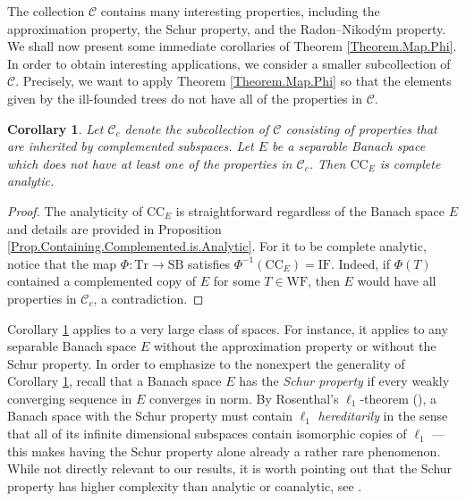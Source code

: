 \documentclass[letterpaper]{amsart}
\numberwithin{equation}{section}
\newtheorem{corollary}[theorem]{Corollary}
\theoremstyle{definition}
\newcommand{\WF}{\mathrm{WF}}
\newcommand{\IF}{\mathrm{IF}}
\newcommand{\Tr}{\mathrm{Tr}}
\newcommand{\SB}{\mathrm{SB}}
\begin{document}
The collection $\mathcal C$ contains many interesting properties, including the approximation property, the Schur property, and the Radon--Nikodým property.  \\




We shall now present some immediate corollaries of Theorem \ref{Theorem.Map.Phi}. In order to obtain interesting applications, we consider a smaller subcollection of $\mathcal C$. Precisely, we want to apply Theorem \ref{Theorem.Map.Phi}  so that the elements given by the ill-founded trees do not have all of the properties in $\mathcal C$.

 
 
\begin{corollary}\label{CorCCE.notSchur.NotAP}
Let $\mathcal {C}_c$ denote the subcollection of $\mathcal C$ consisting of properties that are inherited by complemented subspaces. Let $E$ be a separable Banach space which does not have at least one of the properties in $\mathcal C_c$.  Then $\mathrm{CC}_E$ is complete analytic.
\end{corollary}

\begin{proof}
The analyticity of $\mathrm{CC}_E$  is straightforward regardless of the Banach space $E$ and details are provided in  Proposition \ref{Prop.Containing.Complemented.is.Analytic}. For it to be complete analytic,  notice that the map  $\Phi\colon \Tr\to \SB$ satisfies $\Phi^{-1}(\mathrm{CC}_E)=\IF$. Indeed, if $\Phi(T)$ contained a complemented copy of $E$ for some $T\in \WF$, then $E$ would have all properties in $\mathcal C_c$, a contradiction.
\end{proof}


 Corollary \ref{CorCCE.notSchur.NotAP} applies to a very large class of spaces. For instance, it applies to any separable Banach space $E$ without the approximation property or without the Schur property. In order to emphasize to the nonexpert the generality of Corollary \ref{CorCCE.notSchur.NotAP},  recall that a Banach space $E$ has the \emph{Schur property} if every weakly converging sequence in $E$ converges in norm. By Rosenthal's $\ell_1$-theorem (\cite[The Main Theorem]{Rosenthal1974PNAS}),  a Banach space with the Schur property must contain $\ell_1$ \emph{hereditarily} in the sense that all of its infinite dimensional subspaces contain isomorphic copies of $\ell_1$ ---  this makes having the Schur property alone already a rather rare phenomenon. While not directly relevant to our results, it is worth pointing out that  the  Schur property has higher complexity than analytic or coanalytic, see  \cite[Theorem 1.3]{Kurka2018RACSAM}. 
\end{document}
